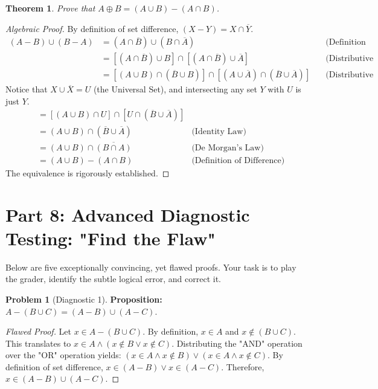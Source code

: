 \documentclass[11pt]{article}
\newtheorem{theorem}{Theorem}[section]
\theoremstyle{definition}
\newtheorem{problem}{Problem}
\begin{document}
\begin{theorem}
Prove that $A \oplus B = (A \cup B) - (A \cap B)$.
\end{theorem}
\begin{proof}[Algebraic Proof]
By definition of set difference, $(X - Y) = X \cap \overline{Y}$.
\begin{align*}
(A - B) \cup (B - A) &= (A \cap \overline{B}) \cup (B \cap \overline{A}) \quad &\text{(Definition of Difference)} \\
&= \left[ (A \cap \overline{B}) \cup B \right] \cap \left[ (A \cap \overline{B}) \cup \overline{A} \right] \quad &\text{(Distributive Law)} \\
&= \left[ (A \cup B) \cap (\overline{B} \cup B) \right] \cap \left[ (A \cup \overline{A}) \cap (\overline{B} \cup \overline{A}) \right] \quad &\text{(Distributive Law applied twice)}
\end{align*}
Notice that $X \cup \overline{X} = U$ (the Universal Set), and intersecting any set $Y$ with $U$ is just $Y$.
\begin{align*}
&= \left[ (A \cup B) \cap U \right] \cap \left[ U \cap (\overline{B} \cup \overline{A}) \right] \\
&= (A \cup B) \cap (\overline{B} \cup \overline{A}) \quad &\text{(Identity Law)} \\
&= (A \cup B) \cap \overline{(B \cap A)} \quad &\text{(De Morgan's Law)} \\
&= (A \cup B) - (A \cap B) \quad &\text{(Definition of Difference)}
\end{align*}
The equivalence is rigorously established.
\end{proof}

\section{Part 8: Advanced Diagnostic Testing: "Find the Flaw"}

Below are five exceptionally convincing, yet flawed proofs. Your task is to play the grader, identify the subtle logical error, and correct it.

\begin{problem}[Diagnostic 1]
\textbf{Proposition:} $A - (B \cup C) = (A - B) \cup (A - C)$.
\begin{proof}[Flawed Proof]
Let $x \in A - (B \cup C)$. By definition, $x \in A$ and $x \notin (B \cup C)$. This translates to $x \in A \land (x \notin B \lor x \notin C)$. Distributing the "AND" operation over the "OR" operation yields: $(x \in A \land x \notin B) \lor (x \in A \land x \notin C)$. By definition of set difference, $x \in (A - B) \lor x \in (A - C)$. Therefore, $x \in (A - B) \cup (A - C)$.
\end{proof}
\end{problem}
\end{document}
